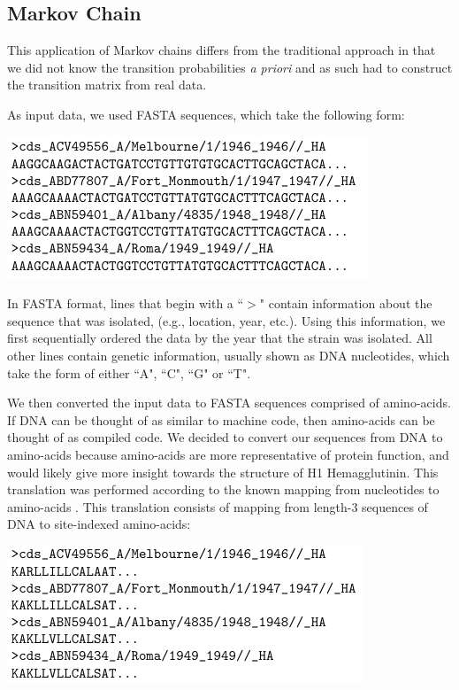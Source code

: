 \documentclass[12pt]{article}
\newenvironment{Figure}
  {\par\medskip\noindent\minipage{\linewidth}}
  {\endminipage\par\medskip}
\begin{document}
\begin{multicols}{2}
\subsection{Markov Chain}

This application of Markov chains differs from the traditional approach in that we did not know the transition probabilities \textit{a priori} and as such had to construct the transition matrix from real data.

As input data, we used FASTA sequences, which take the following form:

\begin{Figure}
 \centering
 \includegraphics[width=\linewidth]{exampleInput.PNG}
\end{Figure}

In FASTA format, lines that begin with a ``$>$" contain information about the sequence that was isolated, (e.g., location, year, etc.). Using this information, we first sequentially ordered the data by the year that the strain was isolated. All other lines contain genetic information, usually shown as DNA nucleotides, which take the form of either ``A", ``C", ``G" or ``T".

We then converted the input data to FASTA sequences comprised of amino-acids. If DNA can be thought of as similar to machine code, then amino-acids can be thought of as compiled code. We decided to convert our sequences from DNA to amino-acids because amino-acids are more representative of protein function, and would likely give more insight towards the structure of H1 Hemagglutinin. This translation was performed according to the known mapping from nucleotides to amino-acids \citep{brendel1986linguistics}. This translation consists of mapping from length-3 sequences of DNA to site-indexed amino-acids:

\begin{Figure}
 \centering
 \includegraphics[width=\linewidth]{exampleIntermediate.PNG}
\end{Figure}


\end{multicols}
\end{document}
